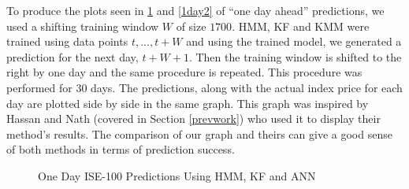 To produce the plots seen in \ref{1day1} and \ref{1day2} of ``one day ahead''
predictions, we used a shifting training window $W$ of size $1700$. HMM, KF and
KMM were trained using data points $t,...,t+W$ and using the trained model, we
generated a prediction for the next day, $t+W+1$. Then the training window is
shifted to the right by one day and the same procedure is repeated. This
procedure was performed for 30 days. The predictions, along with the actual
index price for each day are plotted side by side in the same graph. This graph
was inspired by Hassan and Nath \cite{hassan} (covered in Section
\ref{prevwork}) who used it to display their method's results. The comparison of
our graph and theirs can give a good sense of both methods in terms of
prediction success.

\begin{figure}[!hbp]

\caption{\label{1day1} One Day ISE-100 Predictions Using HMM, KF and ANN}
\vspace{0.6cm}
\end{figure}

